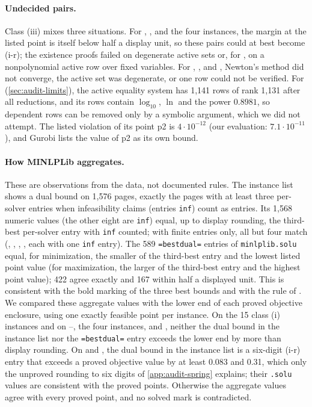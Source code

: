 \paragraph{Undecided pairs.}
Class (iii) mixes three situations.
For , ,  and the four  instances, the margin at the listed point is itself below half a display unit, so these pairs could at best become (i-r); the existence proofs failed on degenerate active sets or, for , on a nonpolynomial active row over fixed variables.
For , ,  and , Newton's method did not converge, the active set was degenerate, or one row could not be verified.
For  (\cref{sec:audit-limits}), the active equality system has 1,141 rows of rank 1,131 after all reductions, and its rows contain $\log_{10}$, $\ln$ and the power $0.8981$, so dependent rows can be removed only by a symbolic argument, which we did not attempt.
The listed violation of its point p2 is $4\cdot10^{-12}$ (our evaluation: $7.1\cdot10^{-11}$), and Gurobi lists the value of p2 as its own bound.

\paragraph{How MINLPLib aggregates.}
These are observations from the data, not documented rules.
The instance list shows a dual bound on 1,576 pages, exactly the pages with at least three per-solver entries when infeasibility claims (entries \texttt{inf}) count as entries.
Its 1,568 numeric values (the other eight are \texttt{inf}) equal, up to display rounding, the third-best per-solver entry with \texttt{inf} counted; with finite entries only, all but four match (, , , , each with one \texttt{inf} entry).
The 589 \texttt{=bestdual=} entries of \texttt{minlplib.solu} equal, for minimization, the smaller of the third-best entry and the lowest listed point value (for maximization, the larger of the third-best entry and the highest point value); 422 agree exactly and 167 within half a displayed unit.
This is consistent with the bold marking of the three best bounds \citep{vigerske2026-minlplib-documentation-database-snapshot-2026} and with the rule of \citet{vigerske2014-minlplib-2}.
We compared these aggregate values with the lower end of each proved objective enclosure, using one exactly feasible point per instance.
On the 15 class (i) instances and on --, the four  instances,  and , neither the dual bound in the instance list nor the \texttt{=bestdual=} entry exceeds the lower end by more than display rounding.
On  and , the dual bound in the instance list is a six-digit (i-r) entry that exceeds a proved objective value by at least 0.083 and 0.31, which only the unproved rounding to six digits of \cref{app:audit-spring} explains; their \texttt{.solu} values are consistent with the proved points.
Otherwise the aggregate values agree with every proved point, and no solved mark is contradicted.

